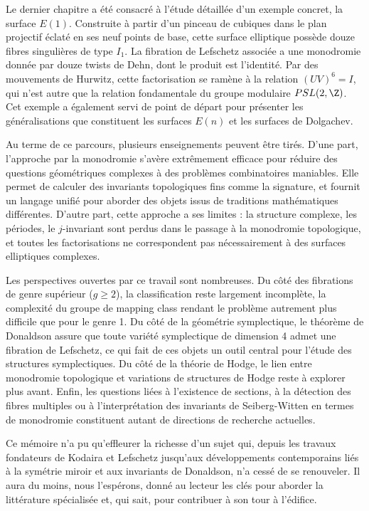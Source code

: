 Le dernier chapitre a été consacré à l'étude détaillée d'un exemple concret, la surface $E(1)$. Construite à partir d'un pinceau de cubiques dans le plan projectif éclaté en ses neuf points de base, cette surface elliptique possède douze fibres singulières de type $I_1$. La fibration de Lefschetz associée a une monodromie donnée par douze twists de Dehn, dont le produit est l'identité. Par des mouvements de Hurwitz, cette factorisation se ramène à la relation $(UV)^6 = I$, qui n'est autre que la relation fondamentale du groupe modulaire $PSL(2,\Z)$. Cet exemple a également servi de point de départ pour présenter les généralisations que constituent les surfaces $E(n)$ et les surfaces de Dolgachev.

Au terme de ce parcours, plusieurs enseignements peuvent être tirés. D'une part, l'approche par la monodromie s'avère extrêmement efficace pour réduire des questions géométriques complexes à des problèmes combinatoires maniables. Elle permet de calculer des invariants topologiques fins comme la signature, et fournit un langage unifié pour aborder des objets issus de traditions mathématiques différentes. D'autre part, cette approche a ses limites : la structure complexe, les périodes, le $j$-invariant sont perdus dans le passage à la monodromie topologique, et toutes les factorisations ne correspondent pas nécessairement à des surfaces elliptiques complexes.

Les perspectives ouvertes par ce travail sont nombreuses. Du côté des fibrations de genre supérieur ($g \ge 2$), la classification reste largement incomplète, la complexité du groupe de mapping class rendant le problème autrement plus difficile que pour le genre 1. Du côté de la géométrie symplectique, le théorème de Donaldson assure que toute variété symplectique de dimension 4 admet une fibration de Lefschetz, ce qui fait de ces objets un outil central pour l'étude des structures symplectiques. Du côté de la théorie de Hodge, le lien entre monodromie topologique et variations de structures de Hodge reste à explorer plus avant. Enfin, les questions liées à l'existence de sections, à la détection des fibres multiples ou à l'interprétation des invariants de Seiberg-Witten en termes de monodromie constituent autant de directions de recherche actuelles.

Ce mémoire n'a pu qu'effleurer la richesse d'un sujet qui, depuis les travaux fondateurs de Kodaira et Lefschetz jusqu'aux développements contemporains liés à la symétrie miroir et aux invariants de Donaldson, n'a cessé de se renouveler. Il aura du moins, nous l'espérons, donné au lecteur les clés pour aborder la littérature spécialisée et, qui sait, pour contribuer à son tour à l'édifice.